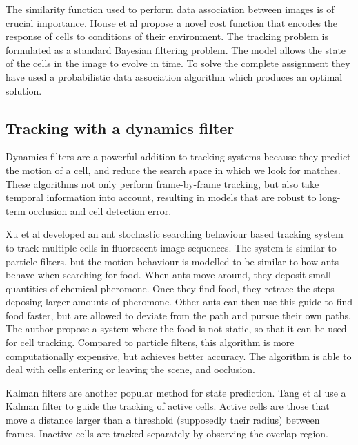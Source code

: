 The similarity function used to perform data association between images is of crucial importance. House et al \cite{house09} propose a novel cost function that encodes the response of cells to conditions of their environment. The tracking problem is formulated as a standard Bayesian filtering problem. The model allows the state of the cells in the image to evolve in time. To solve the complete assignment they have used a probabilistic data association algorithm which produces an optimal solution.

\subsection{Tracking with a dynamics filter \statusfirstdraft}
Dynamics filters are a powerful addition to tracking systems because they predict the motion of a cell, and reduce the search space in which we look for matches. These algorithms not only perform frame-by-frame tracking, but also take temporal information into account, resulting in models that are robust to long-term occlusion and cell detection error.

Xu et al \cite{xu12} developed an ant stochastic searching behaviour based tracking system to track multiple cells in fluorescent image sequences. The system is similar to particle filters, but the motion behaviour is modelled to be similar to how ants behave when searching for food. When ants move around, they deposit small quantities of chemical pheromone. Once they find food, they retrace the steps deposing larger amounts of pheromone. Other ants can then use this guide to find food faster, but are allowed to deviate from the path and pursue their own paths. The author propose a system where the food is not static, so that it can be used for cell tracking. Compared to particle filters, this algorithm is more computationally expensive, but achieves better accuracy. The algorithm is able to deal with cells entering or leaving the scene, and occlusion.

Kalman filters are another popular method for state prediction. Tang et al \cite{tang} use a Kalman filter to guide the tracking of active cells. Active cells are those that move a distance larger than a threshold (supposedly their radius) between frames. Inactive cells are tracked separately by observing the overlap region.

